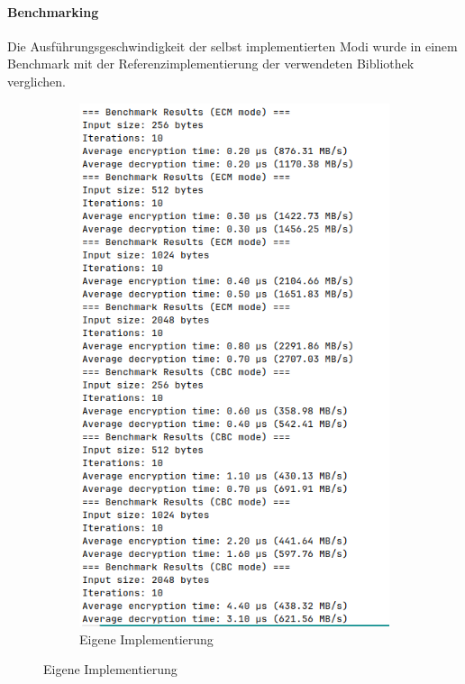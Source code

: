 \paragraph{Benchmarking}
Die Ausführungsgeschwindigkeit der selbst implementierten Modi wurde in einem Benchmark mit der Referenzimplementierung der verwendeten Bibliothek verglichen.
\begin{figure}[h]
    \centering
    \begin{subfigure}[b]{0.49\textwidth}
        \centering
        \includegraphics[width=\textwidth]{img/bench/custombench}
        \caption{Eigene Implementierung}

\end{subfigure}
\end{figure}
